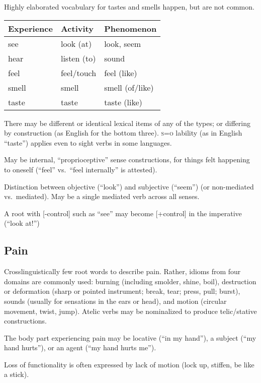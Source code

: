 \documentclass[11pt]{article}
\newcommand{\I}[1]{\textsc{#1}}   %
\begin{document}
Highly elaborated vocabulary for tastes and smells happen, but are not
common. 

\begin{center}
  \begin{tabular}{lll}
    Experience & Activity & Phenomenon \\
    \hline
    see & look (at) & look, seem \\
    hear & listen (to) & sound \\
    feel & feel/touch & feel (like) \\
    smell & smell & smell (of/like) \\
    taste & taste & taste (like)
  \end{tabular}
\end{center}

There may be different or identical lexical items of any of the types;
or differing by construction (as English for the bottom
three).  \I{s=o} lability (as in English ``taste'') applies even to
sight verbs in some languages.

May be internal, ``proprioceptive'' sense constructions, for things
felt happening to oneself (``feel'' vs.\ ``feel internally'' is
attested). 

Distinction between objective (``look'') and subjective (``seem'') (or
non-mediated vs.\ mediated).  May be a single mediated verb across all
senses.

A root with [-control] such as ``see'' may become [+control] in the
imperative (``look at!'')


\subsection{Pain}
Crosslinguistically few root words to describe pain.  Rather, idioms
from four domains are commonly used: burning (including smolder,
shine, boil), destruction or deformation (sharp or pointed instrument;
break, tear; press, pull; burst), sounds (usually for sensations in
the ears or head), and motion (circular movement, twist, jump).
Atelic verbs may be nominalized to produce telic/stative
constructions.

The body part experiencing pain may be locative (``in my hand''), a
subject (``my hand hurts''), or an agent (``my hand hurts me'').

Loss of functionality is often expressed by lack of motion (lock up,
stiffen, be like a stick).
\end{document}
